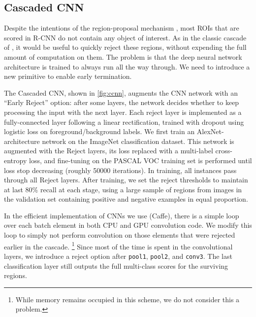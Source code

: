 \subsection{Cascaded CNN}\label{sec:ccnn}

Despite the intentions of the region-proposal mechanism \parencite{Uijlings-IJCV-2013}, most ROIs that are scored in R-CNN do not contain any object of interest.
As in the classic cascade of \cite{Viola-IJCV-2004}, it would be useful to quickly reject these regions, without expending the full amount of computation on them.
The problem is that the deep neural network architecture is trained to always run all the way through.
We need to introduce a new primitive to enable early termination.

The Cascaded CNN, shown in \autoref{fig:ccnn}, augments the CNN network with an ``Early Reject'' option: after some layers, the network decides whether to keep processing the input with the next layer.
Each reject layer is implemented as a fully-connected layer following a linear rectification, trained with dropout using logistic loss on foreground/background labels.
We first train an AlexNet-architecture network \parencite{Krizhevsky-NIPS-2012} on the ImageNet classification dataset.
This network is augmented with the Reject layers, its loss replaced with a multi-label cross-entropy loss, and fine-tuning on the PASCAL VOC training set is performed until loss stop decreasing (roughly 50000 iterations).
In training, all instances pass through all Reject layers.
After training, we set the reject thresholds to maintain at last 80\% recall at each stage, using a large sample of regions from images in the validation set containing positive and negative examples in equal proportion.

In the efficient implementation of CNNs we use (Caffe), there is a simple loop over each batch element in both CPU and GPU convolution code.
We modify this loop to simply not perform convolution on those elements that were rejected earlier in the cascade.
\footnote{While memory remains occupied in this scheme, we do not consider this a problem.}
Since most of the time is spent in the convolutional layers, we introduce a reject option after \texttt{pool1}, \texttt{pool2}, and \texttt{conv3}.
The last classification layer still outputs the full multi-class scores for the surviving regions.

